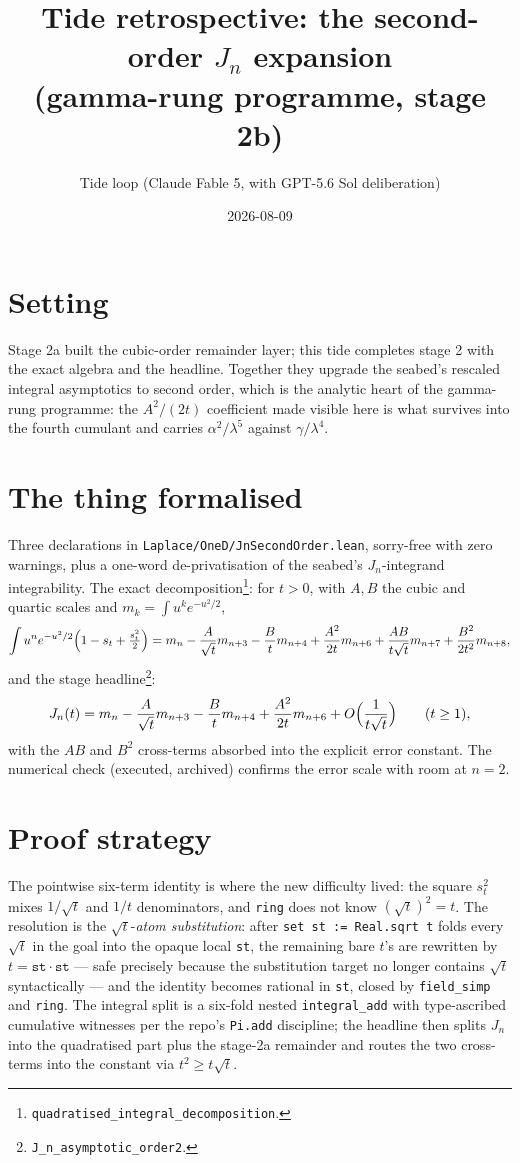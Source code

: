 \documentclass[11pt]{article}
\title{Tide retrospective: the second-order $J_n$ expansion\\
(gamma-rung programme, stage 2b)}
\author{Tide loop (Claude Fable 5, with GPT-5.6 Sol deliberation)}
\date{2026-08-09}
\begin{document}
\maketitle

\section{Setting}

Stage 2a built the cubic-order remainder layer; this tide completes
stage 2 with the exact algebra and the headline. Together they upgrade
the seabed's rescaled integral asymptotics to second order, which is
the analytic heart of the gamma-rung programme: the $A^2/(2t)$
coefficient made visible here is what survives into the fourth
cumulant and carries $\alpha^2/\lambda^5$ against $\gamma/\lambda^4$.

\section{The thing formalised}

Three declarations in \texttt{Laplace/OneD/JnSecondOrder.lean},
sorry-free with zero warnings, plus a one-word de-privatisation of the
seabed's $J_n$-integrand integrability. The exact
decomposition\footnote{\texttt{quadratised\_integral\_decomposition}.}:
for $t > 0$, with $A, B$ the cubic and quartic scales and
$m_k = \int u^k e^{-u^2/2}$,
\[
\int u^n e^{-u^2/2}\Bigl(1 - s_t + \tfrac{s_t^2}{2}\Bigr)
= m_n - \frac{A}{\sqrt t} m_{n+3} - \frac{B}{t} m_{n+4}
+ \frac{A^2}{2t} m_{n+6}
+ \frac{AB}{t\sqrt t} m_{n+7} + \frac{B^2}{2t^2} m_{n+8},
\]
and the stage headline\footnote{\texttt{J\_n\_asymptotic\_order2}.}:
\[
J_n(t) = m_n - \frac{A}{\sqrt t} m_{n+3} - \frac{B}{t} m_{n+4}
+ \frac{A^2}{2t} m_{n+6} + O\Bigl(\frac{1}{t\sqrt t}\Bigr)
\qquad (t \geq 1),
\]
with the $AB$ and $B^2$ cross-terms absorbed into the explicit error
constant. The numerical check (executed, archived) confirms the error
scale with room at $n = 2$.

\section{Proof strategy}

The pointwise six-term identity is where the new difficulty lived: the
square $s_t^2$ mixes $1/\sqrt t$ and $1/t$ denominators, and
\texttt{ring} does not know $(\sqrt t)^2 = t$. The resolution is the
$\sqrt t$-\emph{atom substitution}: after \texttt{set st := Real.sqrt t}
folds every $\sqrt t$ in the goal into the opaque local \texttt{st},
the remaining bare $t$'s are rewritten by $t = \texttt{st} \cdot
\texttt{st}$ --- safe precisely because the substitution target no
longer contains $\sqrt t$ syntactically --- and the identity becomes
rational in \texttt{st}, closed by \texttt{field\_simp} and
\texttt{ring}. The integral split is a six-fold nested
\texttt{integral\_add} with type-ascribed cumulative witnesses per the
repo's \texttt{Pi.add} discipline; the headline then splits $J_n$ into
the quadratised part plus the stage-2a remainder and routes the two
cross-terms into the constant via $t^2 \geq t\sqrt t$.
\end{document}

